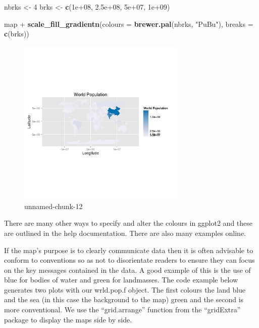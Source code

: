 \documentclass[]{article}
\newenvironment{Shaded}{}{}
\newcommand{\KeywordTok}[1]{\textcolor[rgb]{0.00,0.44,0.13}{\textbf{{#1}}}}
\newcommand{\DataTypeTok}[1]{\textcolor[rgb]{0.56,0.13,0.00}{{#1}}}
\newcommand{\DecValTok}[1]{\textcolor[rgb]{0.25,0.63,0.44}{{#1}}}
\newcommand{\FloatTok}[1]{\textcolor[rgb]{0.25,0.63,0.44}{{#1}}}
\newcommand{\StringTok}[1]{\textcolor[rgb]{0.25,0.44,0.63}{{#1}}}
\newcommand{\NormalTok}[1]{{#1}}
\let\Oldincludegraphics\includegraphics
\renewcommand{\includegraphics}[1]{\Oldincludegraphics[width=8cm]{#1}}
\begin{document}
\begin{Shaded}
\begin{Highlighting}[]
\NormalTok{nbrks <- }\DecValTok{4}
\NormalTok{brks <- }\KeywordTok{c}\NormalTok{(}\FloatTok{1e+08}\NormalTok{, }\FloatTok{2.5e+08}\NormalTok{, }\FloatTok{5e+07}\NormalTok{, }\FloatTok{1e+09}\NormalTok{)}

\NormalTok{map + }\KeywordTok{scale_fill_gradientn}\NormalTok{(}\DataTypeTok{colours =} \KeywordTok{brewer.pal}\NormalTok{(nbrks, }\StringTok{"PuBu"}\NormalTok{), }\DataTypeTok{breaks =} \KeywordTok{c}\NormalTok{(brks))}
\end{Highlighting}
\end{Shaded}
\begin{figure}[htbp]
\centering
\includegraphics{figure/unnamed-chunk-12.png}
\caption{unnamed-chunk-12}
\end{figure}

There are many other ways to specify and alter the colours in ggplot2
and these are outlined in the help documentation. There are also many
examples online.

If the map's purpose is to clearly communicate data then it is often
advisable to conform to conventions so as not to disorientate readers to
ensure they can focus on the key messages contained in the data. A good
example of this is the use of blue for bodies of water and green for
landmasses. The code example below generates two plots with our
wrld.pop.f object. The first colours the land blue and the sea (in this
case the background to the map) green and the second is more
conventional. We use the ``grid.arrange'' function from the
``gridExtra'' package to display the maps side by side.
\end{document}
